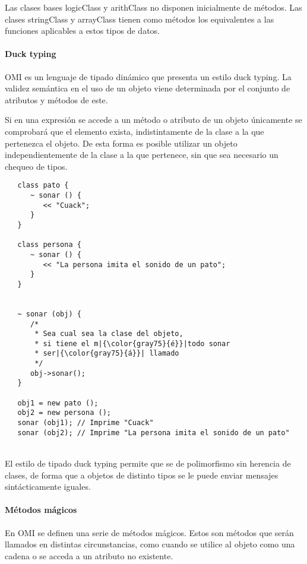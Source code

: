 Las clases bases logicClass y arithClass no disponen inicialmente de métodos.
Las clases stringClass y arrayClass tienen como métodos los equivalentes 
a las funciones aplicables a estos tipos de datos.

\paragraph{Duck typing}

OMI es un lenguaje de tipado dinámico que presenta un estilo duck typing.
La validez semántica en el uso de un objeto viene determinada
por el conjunto de atributos y métodos de este. 

Si en una expresión se accede a un método o atributo de un objeto únicamente se
comprobará que el elemento exista, indistintamente de la clase a la que pertenezca 
el objeto. De esta forma es posible utilizar un objeto independientemente de 
la clase a la que pertenece, sin que sea necesario un chequeo de tipos. \\

\begin{lstlisting}
   class pato {
      ~ sonar () {
         << "Cuack";
      }
   }

   class persona {
      ~ sonar () {
         << "La persona imita el sonido de un pato";
      }
   }


   ~ sonar (obj) {
      /*
       * Sea cual sea la clase del objeto, 
       * si tiene el m|{\color{gray75}{é}}|todo sonar
       * ser|{\color{gray75}{á}}| llamado
       */
      obj->sonar();
   }

   obj1 = new pato ();
   obj2 = new persona ();
   sonar (obj1); // Imprime "Cuack"
   sonar (obj2); // Imprime "La persona imita el sonido de un pato"
\end{lstlisting}
\hfill\\ 

El estilo de tipado duck typing permite que se de polimorfismo sin herencia de 
clases, de forma que a objetos de distinto tipos se le puede enviar mensajes sintácticamente iguales.  

\paragraph {Métodos mágicos} \label{sec:magic_method}

En OMI se definen una serie de métodos mágicos. Estos son métodos que serán 
llamados en distintas circunstancias, como cuando se utilice al objeto 
como una cadena o se acceda a un atributo no existente. 

